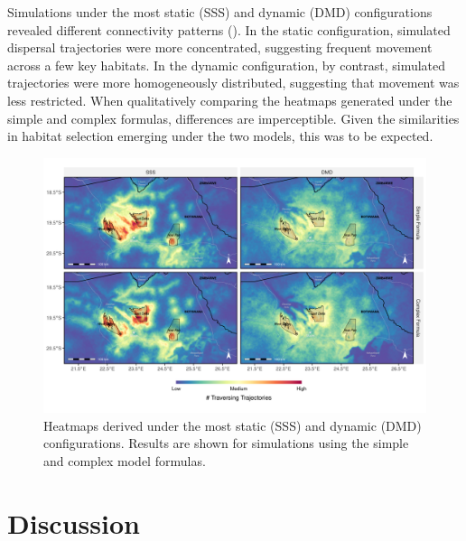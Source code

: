 \documentclass[../FinalThesis.tex]{subfiles}
\begin{document}
Simulations under the most static (SSS) and dynamic (DMD) configurations
revealed different connectivity patterns (). In the
static configuration, simulated dispersal trajectories were more concentrated,
suggesting frequent movement across a few key habitats. In the dynamic
configuration, by contrast, simulated trajectories were more homogeneously
distributed, suggesting that movement was less restricted. When qualitatively
comparing the heatmaps generated under the simple and complex formulas,
differences are imperceptible. Given the similarities in habitat selection
emerging under the two models, this was to be expected.

\begin{figure}[htpb]
 \begin{center}
  \includegraphics[width = \textwidth]{Figures/HeatmapComparison}
  \caption{Heatmaps derived under the most static (SSS) and dynamic (DMD)
  configurations. Results are shown for simulations using the simple and complex
  model formulas.}
  \label{HeatmapComparison}
 \end{center}
\end{figure}

\section{Discussion}

\end{document}
